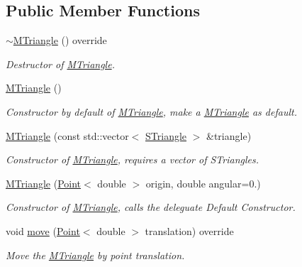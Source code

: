 \subsection*{Public Member Functions}
\begin{DoxyCompactItemize}
\item 
\mbox{\label{classMTriangle_aad494b73728c03ca00e728b0c505a88f}} 
\hyperlink{classMTriangle_aad494b73728c03ca00e728b0c505a88f}{$\sim$\+M\+Triangle} () override
\begin{DoxyCompactList}\small\item\em Destructor of \hyperlink{classMTriangle}{M\+Triangle}. \end{DoxyCompactList}\item 
\mbox{\label{classMTriangle_adca17cfca7632c5967437a7c7e292598}} 
\hyperlink{classMTriangle_adca17cfca7632c5967437a7c7e292598}{M\+Triangle} ()
\begin{DoxyCompactList}\small\item\em Constructor by default of \hyperlink{classMTriangle}{M\+Triangle}, make a \hyperlink{classMTriangle}{M\+Triangle} as default. \end{DoxyCompactList}\item 
\hyperlink{classMTriangle_a428bc13e1f5299369e5c78602aae544b}{M\+Triangle} (const std\+::vector$<$ \hyperlink{classSTriangle}{S\+Triangle} $>$ \&triangle)
\begin{DoxyCompactList}\small\item\em Constructor of \hyperlink{classMTriangle}{M\+Triangle}, requires a vector of S\+Triangles. \end{DoxyCompactList}\item 
\hyperlink{classMTriangle_aaf64b05da66c9196dcddbd0e4791096f}{M\+Triangle} (\hyperlink{classPoint}{Point}$<$ double $>$ origin, double angular=0.)
\begin{DoxyCompactList}\small\item\em Constructor of \hyperlink{classMTriangle}{M\+Triangle}, calls the deleguate Default Constructor. \end{DoxyCompactList}\item 
void \hyperlink{classMTriangle_a1b029feefcf7e3febcdae179557b4c2e}{move} (\hyperlink{classPoint}{Point}$<$ double $>$ translation) override
\begin{DoxyCompactList}\small\item\em Move the \hyperlink{classMTriangle}{M\+Triangle} by point translation. \end{DoxyCompactList}\item 

\end{DoxyCompactItemize}
